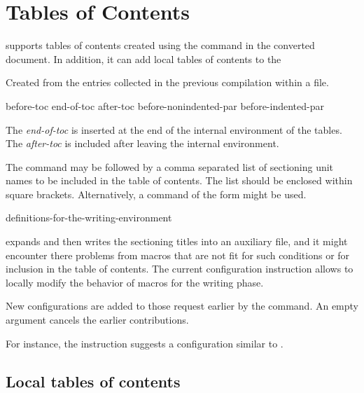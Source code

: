\section{Tables of Contents}

\texfourht{} supports tables of contents created using the 
command in the converted document. In addition, it can add local tables of contents
to the 

Created from the entries collected in the previous compilation within
a  file.


 {before-toc} {end-of-toc} {after-toc} {before-nonindented-par} {before-indented-par}\EndDoc

The \textit{end-of-toc} is inserted at the end of the internal environment of the tables. 
The \textit{after-toc} is included after leaving the internal environment. 


The  command may be followed by a comma separated
list of sectioning unit names to be included in the table of
contents.  The list should be enclosed within square brackets.
Alternatively, a command of the form \oarg{\ldots} might
be used.

 {definitions-for-the-writing-environment}\EndDoc

\texfourht{} expands and then writes the sectioning titles into an auxiliary
file, and it might encounter there problems from macros that are not fit for
such conditions or for inclusion in the table of contents. The current
configuration instruction allows to locally modify the behavior of macros for
the writing phase.


New configurations are added to those request earlier by the command.  An empty
argument cancels the earlier contributions.

For instance, the instruction  suggests a configuration
similar to . 

\subsection{Local tables of contents}

